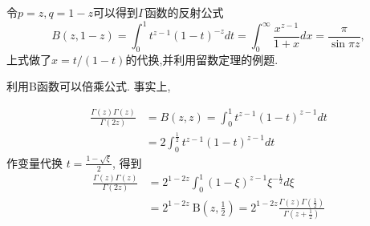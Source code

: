 令$p=z, q=1-z$可以得到$\Gamma$函数的反射公式
\begin{equation}
    B(z, 1-z) = \int_0^{1} t^{z-1} (1-t)^{-z} dt 
     = \int_0^{\infty} \frac{x^{z-1}}{1+x} dx
     = \frac{\pi}{\sin{\pi z} }, 
\end{equation}
上式做了$x = t/(1-t)$的代换,并利用留数定理的例题.


利用B函数可以倍乘公式. 事实上,

\begin{equation}
\begin{aligned}
\frac{\Gamma(z) \Gamma(z)}{\Gamma(2 z)} & =B(z, z)=\int_{0}^{1} t^{z-1}(1-t)^{z-1} d t \\
& =2 \int_{0}^{\frac{1}{2}} t^{z-1}(1-t)^{z-1} d t
\end{aligned}
\end{equation}
作变量代换 $t=\frac{1-\sqrt{\xi}}{2}$, 得到
$$
\begin{aligned}
\frac{\Gamma(z) \Gamma(z)}{\Gamma(2 z)} & =2^{1-2 z} \int_{0}^{1}(1-\xi)^{z-1} \xi^{-\frac{1}{2}} d \xi \\
& =2^{1-2 z} \mathrm{~B}\left(z, \frac{1}{2}\right)=2^{1-2 z} \frac{\Gamma(z) \Gamma\left(\frac{1}{2}\right)}{\Gamma\left(z+\frac{1}{2}\right)}
\end{aligned}
$$

